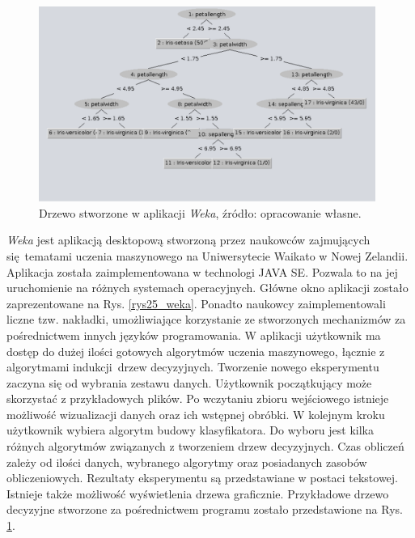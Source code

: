 \begin{figure}[htb]
	\centering
	\includegraphics[width=11cm]{grafika/weka_tree.eps}
	\caption{Drzewo stworzone w aplikacji \textit{Weka}, źródło: opracowanie własne.}
	\label{rys26_weka_tree}
\end{figure}

\textit{Weka} jest aplikacją desktopową stworzoną przez naukowców zajmujących się tematami uczenia maszynowego na Uniwersytecie Waikato w Nowej Zelandii. Aplikacja została zaimplementowana w technologi JAVA SE. Pozwala to na jej uruchomienie na różnych systemach operacyjnych. Główne okno aplikacji zostało zaprezentowane na Rys. \ref{rys25_weka}. Ponadto naukowcy zaimplementowali liczne tzw. nakładki, umożliwiające korzystanie ze stworzonych mechanizmów za pośrednictwem innych języków programowania. W aplikacji użytkownik ma dostęp do dużej ilości gotowych algorytmów uczenia maszynowego, łącznie z algorytmami indukcji drzew decyzyjnych. Tworzenie nowego eksperymentu zaczyna się od wybrania zestawu danych. Użytkownik początkujący może skorzystać z przykładowych plików. Po wczytaniu zbioru wejściowego istnieje możliwość wizualizacji danych oraz ich wstępnej obróbki. W kolejnym kroku użytkownik wybiera algorytm budowy klasyfikatora. Do wyboru jest kilka różnych algorytmów związanych z tworzeniem drzew decyzyjnych. Czas obliczeń zależy od ilości danych, wybranego algorytmy oraz posiadanych zasobów obliczeniowych. Rezultaty eksperymentu są przedstawiane w postaci tekstowej. Istnieje także możliwość wyświetlenia drzewa graficznie. Przykładowe drzewo decyzyjne stworzone za pośrednictwem programu zostało przedstawione na Rys. \ref{rys26_weka_tree}.

